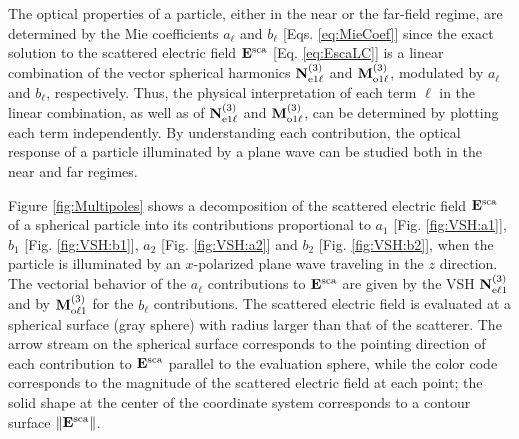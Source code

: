 
The optical properties of a particle, either in the near or the far-field regime,  are determined by the Mie coefficients   $a_\ell$ and $b_\ell$ [Eqs. \eqref{eq:MieCoef}] since the exact solution to the scattered electric field $\vb{E}^\text{sca}$ [Eq. \eqref{eq:EscaLC}] is a linear combination of the vector spherical harmonics $\vb{N}^{(3)}_{\text{e}1\ell}$ and $\vb{M}^{(3)}_{\text{o}1\ell}$, modulated by  $a_\ell$ and $b_\ell$, respectively. Thus, the physical interpretation of each term $\ell$ in the linear combination, as well as of $\vb{N}^{(3)}_{\text{e}1\ell}$ and $\vb{M}^{(3)}_{\text{o}1\ell}$, can be determined by plotting each term independently. By understanding each contribution, the optical response of a particle illuminated by a plane wave can be studied both in the near and far regimes.

Figure \ref{fig:Multipoles} shows a decomposition of the scattered electric field  $\vb{E}^\text{sca}$ of a spherical particle into its contributions proportional to $a_1$ [Fig. \ref{fig:VSH:a1}], $b_1$ [Fig. \ref{fig:VSH:b1}], $a_2$ [Fig. \ref{fig:VSH:a2}] and $b_2$ [Fig. \ref{fig:VSH:b2}], when the particle is illuminated by an $x$-polarized plane wave traveling in the $z$ direction. The vectorial behavior of the $a_\ell$ contributions to $\vb{E}^\text{sca}$ are given by the VSH $\vb{N}^{(3)}_{\text{e}\ell 1}$ and by $\vb{M}^{(3)}_{\text{o}\ell 1}$ for the $b_\ell$ contributions. The  scattered electric field  is evaluated at a spherical surface (gray sphere) with radius larger than that of the scatterer. The arrow stream on the spherical surface corresponds to the pointing direction of each contribution to $\vb{E}^\text{sca}$ parallel to the evaluation sphere, while the color code corresponds to the magnitude of the scattered electric field at each point; the solid shape at the center of the coordinate system corresponds to a contour surface $\norm{\vb{E}^\text{sca}}$.
%

